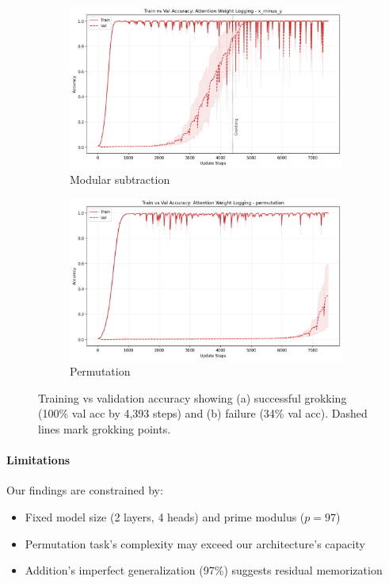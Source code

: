 \documentclass{article} %
\begin{document}
\begin{figure}[h]
    \centering
    \begin{subfigure}{0.49\textwidth}
        \includegraphics[width=\textwidth]{train_val_acc_x_minus_y_run_1.png}
        \caption{Modular subtraction}
        \label{fig:minus_acc}
    \end{subfigure}
    \hfill
    \begin{subfigure}{0.49\textwidth}
        \includegraphics[width=\textwidth]{train_val_acc_permutation_run_1.png}
        \caption{Permutation}
        \label{fig:perm_acc}
    \end{subfigure}
    \caption{Training vs validation accuracy showing (a) successful grokking (100\% val acc by 4,393 steps) and (b) failure (34\% val acc). Dashed lines mark grokking points.}
    \label{fig:acc_comparison}
\end{figure}

\paragraph{Limitations} Our findings are constrained by:
\begin{itemize}
    \item Fixed model size (2 layers, 4 heads) and prime modulus ($p=97$)
    \item Permutation task's complexity may exceed our architecture's capacity
    \item Addition's imperfect generalization (97\%) suggests residual memorization
\end{itemize}
\end{document}
